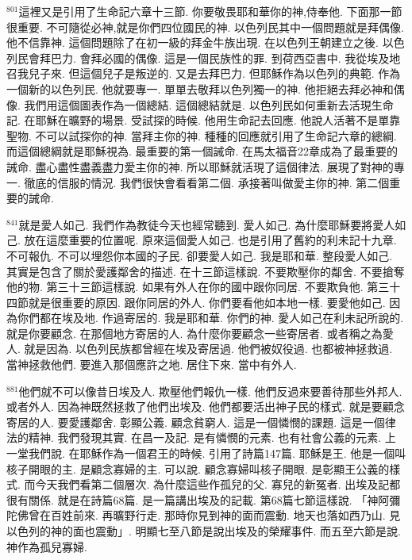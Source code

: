 \documentclass{book}
\begin{document}
$^{801}$這裡又是引用了生命記六章十三節.
你要敬畏耶和華你的神,侍奉他.
下面那一節很重要.
不可隨從必神,就是你們四位國民的神.
以色列民其中一個問題就是拜偶像.
他不信靠神.
這個問題除了在初一級的拜金牛族出現.
在以色列王朝建立之後.
以色列民會拜巴力.
會拜必國的偶像.
這是一個民族性的罪.
到荷西亞書中.
我從埃及地召我兒子來.
但這個兒子是叛逆的.
又是去拜巴力.
但耶穌作為以色列的典範.
作為一個新的以色列民.
他就要專一.
單單去敬拜以色列獨一的神.
他拒絕去拜必神和偶像.
我們用這個圖表作為一個總結.
這個總結就是.
以色列民如何重新去活現生命記.
在耶穌在曠野的場景.
受試探的時候.
他用生命記去回應.
他說人活著不是單靠聖物.
不可以試探你的神.
當拜主你的神.
種種的回應就引用了生命記六章的總綱.
而這個總綱就是耶穌視為.
最重要的第一個誡命.
在馬太福音22章成為了最重要的誡命.
盡心盡性盡義盡力愛主你的神.
所以耶穌就活現了這個律法.
展現了對神的專一.
徹底的信服的情況.
我們很快會看看第二個.
承接著叫做愛主你的神.
第二個重要的誡命.

$^{841}$就是愛人如己.
我們作為教徒今天也經常聽到.
愛人如己.
為什麼耶穌要將愛人如己.
放在這麼重要的位置呢.
原來這個愛人如己.
也是引用了舊約的利未記十九章.
不可報仇.
不可以埋怨你本國的子民.
卻要愛人如己.
我是耶和華.
整段愛人如己.
其實是包含了關於愛護鄰舍的描述.
在十三節這樣說.
不要欺壓你的鄰舍.
不要搶奪他的物.
第三十三節這樣說.
如果有外人在你的國中跟你同居.
不要欺負他.
第三十四節就是很重要的原因.
跟你同居的外人.
你們要看他如本地一樣.
要愛他如己.
因為你們都在埃及地.
作過寄居的.
我是耶和華.
你們的神.
愛人如己在利未記所說的.
就是你要顧念.
在那個地方寄居的人.
為什麼你要顧念一些寄居者.
或者稱之為愛人.
就是因為.
以色列民族都曾經在埃及寄居過.
他們被奴役過.
也都被神拯救過.
當神拯救他們.
要進入那個應許之地.
居住下來.
當中有外人.

$^{881}$他們就不可以像昔日埃及人.
欺壓他們報仇一樣.
他們反過來要善待那些外邦人.
或者外人.
因為神既然拯救了他們出埃及.
他們都要活出神子民的樣式.
就是要顧念寄居的人.
要愛護鄰舍.
彰顯公義.
顧念貧窮人.
這是一個憐憫的課題.
這是一個律法的精神.
我們發現其實.
在昌一及記.
是有憐憫的元素.
也有社會公義的元素.
上一堂我們說.
在耶穌作為一個君王的時候.
引用了詩篇147篇.
耶穌是王.
他是一個叫核子開眼的主.
是顧念寡婦的主.
可以說.
顧念寡婦叫核子開眼.
是彰顯王公義的樣式.
而今天我們看第二個層次.
為什麼這些作孤兒的父.
寡兒的新冤者.
出埃及記都很有關係.
就是在詩篇68篇.
是一篇講出埃及的記載.
第68篇七節這樣說.
「神阿彌陀佛曾在百姓前來.
再曠野行走.
那時你見到神的面而震動.
地天也落如西乃山.
見以色列的神的面也震動」.
明顯七至八節是說出埃及的榮耀事件.
而五至六節是說.
神作為孤兒寡婦.
\end{document}
